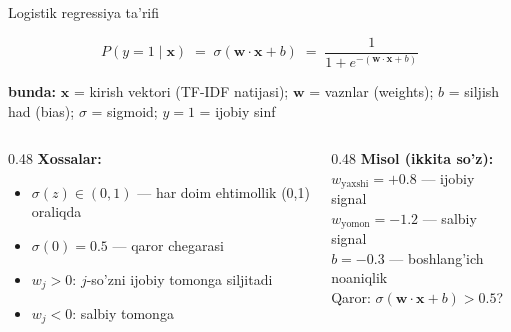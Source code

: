 \documentclass[aspectratio=169,11pt]{beamer}
\newcommand{\bunda}[1]{{\small\textbf{bunda:}\; #1}}
\begin{document}
\begin{frame}{Logistik regressiya ta'rifi}
  \begin{tcolorbox}[defbox,title=Ta'rif: LR Bashorat funksiyasi]
    \[
      P(y{=}1\mid\mathbf{x})
      \;=\;
      \sigma(\mathbf{w}\cdot\mathbf{x}+b)
      \;=\;
      \frac{1}{1+e^{-(\mathbf{w}\cdot\mathbf{x}+b)}}
    \]
  \end{tcolorbox}
  \vspace{3pt}
  \bunda{%
    $\mathbf{x}$ = kirish vektori (TF-IDF natijasi);\;
    $\mathbf{w}$ = vaznlar (weights);\;
    $b$ = siljish had (bias);\;
    $\sigma$ = sigmoid;\;
    $y{=}1$ = ijobiy sinf%
  }
  \vspace{5pt}
  \begin{columns}[T]
    \begin{column}{0.48\textwidth}
      \small
      \textbf{Xossalar:}
      \begin{itemize}
        \item $\sigma(z)\in(0,1)$ --- har doim ehtimollik (0,1) oraliqda
        \item $\sigma(0)=0.5$ --- qaror chegarasi
        \item $w_j>0$: $j$-so'zni ijobiy tomonga siljitadi
        \item $w_j<0$: salbiy tomonga
      \end{itemize}
    \end{column}
    \begin{column}{0.48\textwidth}
      \small
      \textbf{Misol (ikkita so'z):}\\[3pt]
      $w_{\text{yaxshi}}=+0.8$ --- ijobiy signal\\
      $w_{\text{yomon}}=-1.2$ --- salbiy signal\\
      $b=-0.3$ --- boshlang'ich noaniqlik\\[4pt]
      \textcolor{halfgray}{\footnotesize Qaror:
      $\sigma(\mathbf{w}\cdot\mathbf{x}+b)>0.5$?}
    \end{column}
  \end{columns}
\end{frame}
\end{document}
